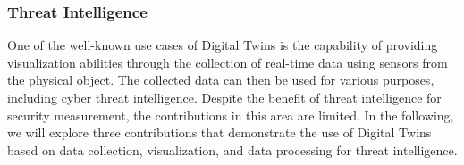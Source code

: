 



\subsubsection{Threat Intelligence}

One of the well-known use cases of Digital Twins is the capability of providing visualization abilities through the collection of real-time data using sensors from the physical object. The collected data can then be used for various purposes, including cyber threat intelligence. Despite the benefit of threat intelligence for security measurement, the contributions in this area are limited. In the following, we will explore three contributions that demonstrate the use of Digital Twins based on data collection, visualization, and data processing for threat intelligence.    

